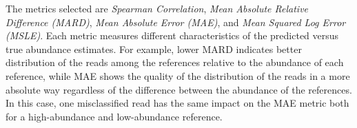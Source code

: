 The metrics selected are \emph{Spearman Correlation}, \emph{Mean Absolute
Relative Difference (MARD)}, \emph{Mean Absolute Error (MAE)}, and
\emph{Mean Squared Log Error (MSLE)}. Each metric measures different
characteristics of the predicted versus true abundance estimates. For example,
lower MARD indicates better distribution of the reads among the
references relative to the abundance of each reference, while MAE shows
the quality of the distribution of the reads in a more absolute way
regardless of the difference between the abundance of the references. In
this case, one misclassified read has the same impact on the MAE metric
both for a high-abundance and low-abundance reference.

\begin{table}%
    \centering
\end{table}
